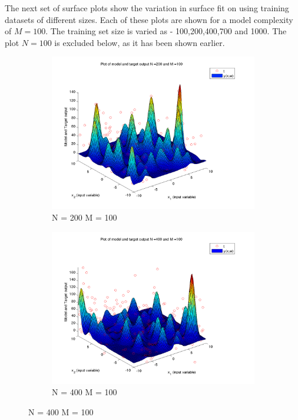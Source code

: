 \documentclass{article}
\begin{document}
\begin{flushleft}
The next set of surface plots show the variation in surface fit on using training datasets of different sizes. Each of these plots are shown for a model complexity of $M = 100$. The training set size is varied as - 100,200,400,700 and 1000. The plot $N =100$ is excluded below, as it has been shown earlier.

\end{flushleft}
\begin{figure}[H]

\begin{subfigure}{.5\textwidth}
\centering
\includegraphics[width=\linewidth]{D2/VaryingN_N200M100}
\caption{N = 200 M = 100}
\end{subfigure}
\begin{subfigure}{.5\textwidth}
\includegraphics[width=\linewidth]{D2/VaryingN_N400M100}
\caption{N = 400 M = 100}
\end{subfigure}



\end{figure}
\end{document}
